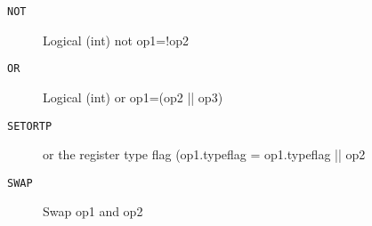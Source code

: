 
\begin{description}
\item[\texttt{NOT        }]  Logical (int) not op1=!op2\\
\end{description}

\begin{description}
\item[\texttt{OR         }]  Logical (int) or op1=(op2 || op3)\\
\end{description}

\begin{description}
\item[\texttt{SETORTP    }]  or the register type flag (op1.typeflag = op1.typeflag || op2\\
\end{description}

\begin{description}
\item[\texttt{SWAP       }]  Swap op1 and op2\\
\end{description}

